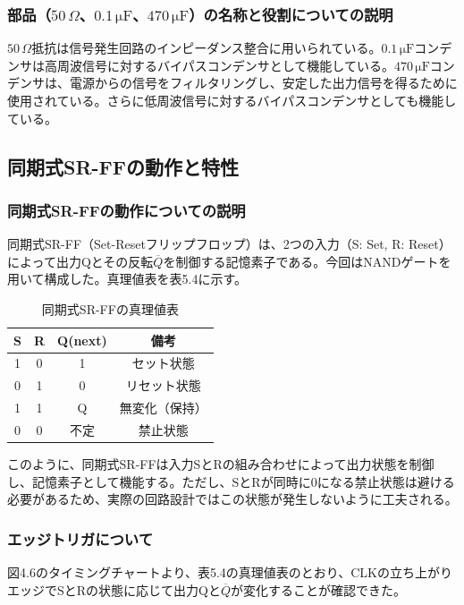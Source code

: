 \documentclass{jlreq}
\numberwithin{equation}{section}
\begin{document}
\subsubsection{部品（$50\,\Omega$、$0.1\,\mathrm{\mu F}$、$470\,\mathrm{\mu F}$）の名称と役割についての説明}
$50\,\Omega$抵抗は信号発生回路のインピーダンス整合に用いられている。$0.1\,\mathrm{\mu F}$コンデンサは高周波信号に対するバイパスコンデンサとして機能している。$470\,\mathrm{\mu F}$コンデンサは、電源からの信号をフィルタリングし、安定した出力信号を得るために使用されている。さらに低周波信号に対するバイパスコンデンサとしても機能している。

\subsection{同期式SR-FFの動作と特性}
\subsubsection{同期式SR-FFの動作についての説明}
同期式SR-FF（Set-Resetフリップフロップ）は、2つの入力（S: Set, R: Reset）によって出力Qとその反転$\overline{Q}$を制御する記憶素子である。今回はNANDゲートを用いて構成した。真理値表を表5.4に示す。

\begin{table}[H]
  \centering
  \caption{同期式SR-FFの真理値表}
  \begin{tabular}{|c|c|c|c|}
    \hline
    S & R & Q(next) & 備考 \\ \hline
    1 & 0 & 1 & セット状態 \\ \hline
    0 & 1 & 0 & リセット状態 \\ \hline
    1 & 1 & Q & 無変化（保持） \\ \hline
    0 & 0 & 不定 & 禁止状態 \\ \hline
  \end{tabular}
\end{table}

このように、同期式SR-FFは入力SとRの組み合わせによって出力状態を制御し、記憶素子として機能する。ただし、SとRが同時に0になる禁止状態は避ける必要があるため、実際の回路設計ではこの状態が発生しないように工夫される。

\subsubsection{エッジトリガについて}
図4.6のタイミングチャートより、表5.4の真理値表のとおり、CLKの立ち上がりエッジでSとRの状態に応じて出力Qと$\overline{Q}$が変化することが確認できた。
\end{document}
